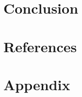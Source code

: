 \documentclass[11pt, oneside]{article}
\begin{document}

\section{Conclusion}


\section{References}


\section{Appendix}
\end{document}
